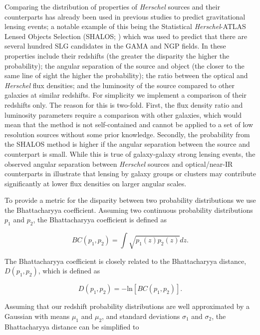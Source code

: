 Comparing the distribution of properties of \textit{Herschel} sources and their counterparts has already been used in previous studies to predict gravitational lensing events; a notable example of this being the Statistical \textit{Herschel}-ATLAS Lensed Objects Selection (SHALOS; \citealt{Gonzalez-Nuevo_2019}) which was used to predict that there are several hundred SLG candidates in the GAMA and NGP fields. In \citealt{Gonzalez-Nuevo_2019} these properties include their redshifts (the greater the disparity the higher the probability); the angular separation of the source and object (the closer to the same line of sight the higher the probability); the ratio between the optical and \textit{Herschel} flux densities; and the luminosity of the source compared to other galaxies at similar redshifts. For simplicity we implement a comparison of their redshifts only. The reason for this is two-fold. First, the flux density ratio and luminosity parameters require a comparison with other galaxies, which would mean that the method is not self-contained and cannot be applied to a set of low resolution sources without some prior knowledge. Secondly, the probability from the SHALOS method is higher if the angular separation between the source and counterpart is small. While this is true of galaxy-galaxy strong lensing events, the observed angular separation between \textit{Herschel} sources and optical/near-IR counterparts in \citealt{Bakx_2020} illustrate that lensing by galaxy groups or clusters may contribute significantly at lower flux densities on larger angular scales.

To provide a metric for the disparity between two probability distributions we use the Bhattacharyya coefficient. Assuming two continuous probability distributions $p_1$ and $p_2$, the Bhattacharyya coefficient is defined as

\begin{equation}
    BC(p_1, p_2) = \int \sqrt{p_1(z) p_2(z)} dz.
\end{equation}

The Bhattacharyya coefficient is closely related to the Bhattacharyya distance, $D(p_1,p_2)$, which is defined as

\begin{equation}
    D(p_1, p_2) = -\textrm{ln}[BC(p_1, p_2)].
\label{eq:Bhattacharyya_distance}
\end{equation}

Assuming that our redshift probability distributions are well approximated by a Gaussian with means $\mu_1$ and $\mu_2$, and standard deviations $\sigma_1$ and $\sigma_2$, the Bhattacharyya distance can be simplified to

